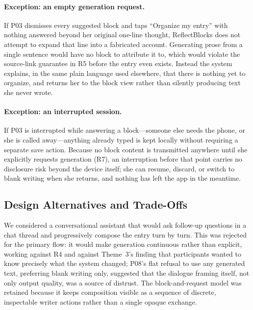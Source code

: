 \documentclass[sigconf,nonacm]{acmart}
\begin{document}
\paragraph{Exception: an empty generation request.} If P03 dismisses every
suggested block and taps ``Organize my entry'' with nothing answered beyond
her original one-line thought, ReflectBlocks does not attempt to expand that
line into a fabricated account. Generating prose from a single sentence would
have no block to attribute it to, which would violate the source-link
guarantee in R5 before the entry even exists. Instead the system explains, in
the same plain language used elsewhere, that there is nothing yet to
organize, and returns her to the block view rather than silently producing
text she never wrote.

\paragraph{Exception: an interrupted session.} If P03 is interrupted while
answering a block---someone else needs the phone, or she is called
away---anything already typed is kept locally without requiring a separate
save action. Because no block content is transmitted anywhere until she
explicitly requests generation (R7), an interruption before that point
carries no disclosure risk beyond the device itself; she can resume, discard,
or switch to blank writing when she returns, and nothing has left the app in
the meantime.

\subsection{Design Alternatives and Trade-Offs}
\label{sec:altdesign}

We considered a conversational assistant that would ask follow-up questions in
a chat thread and progressively compose the entry turn by turn. This was
rejected for the primary flow: it would make generation continuous rather than
explicit, working against R4 and against Theme~3's finding that participants
wanted to know precisely what the system changed; P08's flat refusal to use
any generated text, preferring blank writing only, suggested that the dialogue
framing itself, not only output quality, was a source of distrust. The block-and-request model was
retained because it keeps composition visible as a sequence of discrete,
inspectable writer actions rather than a single opaque exchange.
\end{document}
